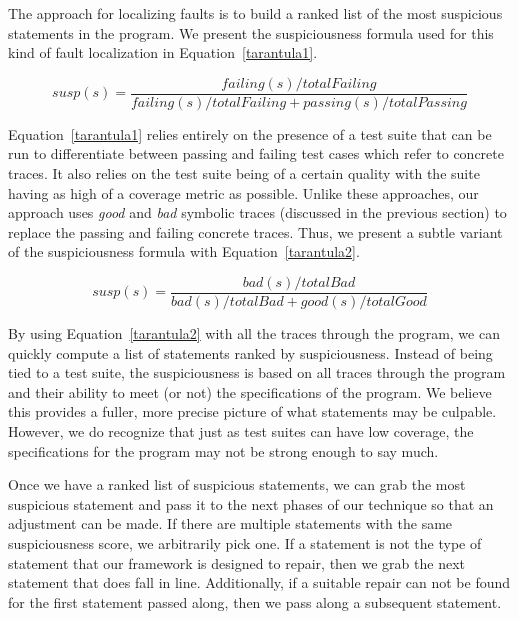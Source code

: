 \documentclass[]{article}
\begin{document}
The approach for localizing faults is to build a ranked list of the most
suspicious statements in the program. We present the suspiciousness formula
used for this kind of fault localization in Equation~\ref{tarantula1}.

\begin{equation}
\label{tarantula1}
    susp(s) = \frac{failing(s)/totalFailing}{failing(s)/totalFailing + passing(s)/totalPassing}
\end{equation}

Equation~\ref{tarantula1} relies entirely on the presence of a test suite
that can be run to differentiate between passing and failing test cases
which refer to concrete traces. It also relies on the test suite being of a
certain quality with the suite having as high of a coverage metric as
possible. Unlike these approaches, our approach uses \emph{good} and
\emph{bad} symbolic traces (discussed in the previous section) to replace
the passing and failing concrete traces. Thus, we present a subtle variant
of the suspiciousness formula with Equation~\ref{tarantula2}.

\begin{equation}
\label{tarantula2}
    susp(s) = \frac{bad(s)/totalBad}{bad(s)/totalBad + good(s)/totalGood}
\end{equation}

By using Equation~\ref{tarantula2} with all the traces through the program, we can
quickly compute a list of statements ranked by suspiciousness. Instead of
being tied to a test suite, the suspiciousness is based on all traces
through the program and their ability to meet (or not) the specifications of
the program. We believe this provides a fuller, more precise picture of what
statements may be culpable. However, we do recognize that just as test
suites can have low coverage, the specifications for the program may not be
strong enough to say much.

Once we have a ranked list of suspicious statements, we can grab the most
suspicious statement and pass it to the next phases of our technique so that
an adjustment can be made. If there are multiple statements with the same
suspiciousness score, we arbitrarily pick one. If a statement is not the type of
statement that our framework is designed to repair, then we grab the next statement
that does fall in line. Additionally, if a suitable repair can not be found for the
first statement passed along, then we pass along a subsequent statement.
\end{document}
